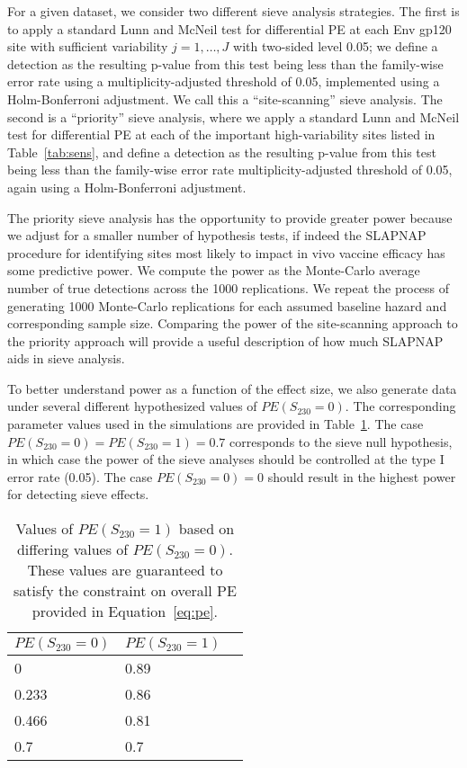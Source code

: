 \documentclass[10pt]{article}
\begin{document}
For a given dataset, we consider two different sieve analysis strategies. The first is to apply a standard Lunn and McNeil test for differential PE at each Env gp120 site with sufficient variability $j = 1, \ldots, J$ with two-sided level 0.05; we define a detection as the resulting p-value from this test being less than the family-wise error rate using a multiplicity-adjusted threshold of 0.05, implemented using a Holm-Bonferroni adjustment. We call this a ``site-scanning'' sieve analysis. The second is a ``priority'' sieve analysis, where we apply a standard Lunn and McNeil test for differential PE at each of the important high-variability sites listed in Table~\ref{tab:sens}, and define a detection as the resulting p-value from this test being less than the family-wise error rate multiplicity-adjusted threshold of 0.05, again using a Holm-Bonferroni adjustment.

The priority sieve analysis has the opportunity to provide greater power because we adjust for a smaller number of hypothesis tests, if indeed the SLAPNAP procedure for identifying sites most likely to impact in vivo vaccine efficacy has some predictive power. We compute the power as the Monte-Carlo average number of true detections across the 1000 replications. We repeat the process of generating 1000 Monte-Carlo replications for each assumed baseline hazard and corresponding sample size. Comparing the power of the site-scanning approach to the priority approach will provide a useful description of how much SLAPNAP aids in sieve analysis.

To better understand power as a function of the effect size, we also generate data under several different hypothesized values of $PE(S_{230} = 0)$. The corresponding parameter values used in the simulations are provided in Table~\ref{tab:effect_size}. The case $PE(S_{230} = 0) = PE(S_{230} = 1) = 0.7$ corresponds to the sieve null hypothesis, in which case the power of the sieve analyses should be controlled at the type I error rate (0.05). The case $PE(S_{230} = 0) = 0$ should result in the highest power for detecting sieve effects.

\begin{table}
  \centering
  \caption{Values of $PE(S_{230} = 1)$ based on differing values of $PE(S_{230} = 0)$. These values are guaranteed to satisfy the constraint on overall PE provided in Equation~\eqref{eq:pe}.}
  \label{tab:effect_size}
  \begin{tabular}{lll}
    $PE(S_{230} = 0)$ & $PE(S_{230} = 1)$ \\
    \hline
    0 & 0.89 \\
    0.233 & 0.86 \\
    0.466 & 0.81\\
    0.7 & 0.7
  \end{tabular}
\end{table}
\end{document}
